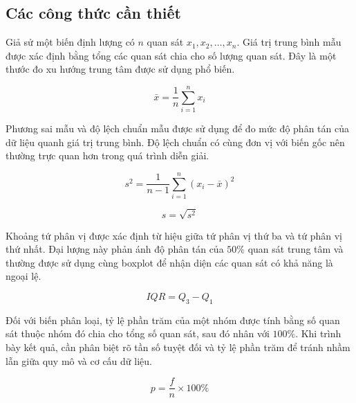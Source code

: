 \documentclass[../main.tex]{subfiles}
\begin{document}
\subsection{Các công thức cần thiết}

Giả sử một biến định lượng có $n$ quan sát $x_1, x_2, \ldots, x_n$. Giá trị trung bình mẫu được xác định bằng tổng các quan sát chia cho số lượng quan sát. Đây là một thước đo xu hướng trung tâm được sử dụng phổ biến.

\begin{equation}
    \bar{x} = \frac{1}{n}\sum_{i=1}^{n}x_i
\end{equation}

Phương sai mẫu và độ lệch chuẩn mẫu được sử dụng để đo mức độ phân tán của dữ liệu quanh giá trị trung bình. Độ lệch chuẩn có cùng đơn vị với biến gốc nên thường trực quan hơn trong quá trình diễn giải.

\begin{equation}
    s^2 = \frac{1}{n-1}\sum_{i=1}^{n}(x_i-\bar{x})^2
\end{equation}

\begin{equation}
    s = \sqrt{s^2}
\end{equation}

Khoảng tứ phân vị được xác định từ hiệu giữa tứ phân vị thứ ba và tứ phân vị thứ nhất. Đại lượng này phản ánh độ phân tán của $50\%$ quan sát trung tâm và thường được sử dụng cùng boxplot để nhận diện các quan sát có khả năng là ngoại lệ.

\begin{equation}
    IQR = Q_3-Q_1
\end{equation}

Đối với biến phân loại, tỷ lệ phần trăm của một nhóm được tính bằng số quan sát thuộc nhóm đó chia cho tổng số quan sát, sau đó nhân với $100\%$. Khi trình bày kết quả, cần phân biệt rõ tần số tuyệt đối và tỷ lệ phần trăm để tránh nhầm lẫn giữa quy mô và cơ cấu dữ liệu.

\begin{equation}
    p = \frac{f}{n}\times 100\%
\end{equation}
\end{document}
